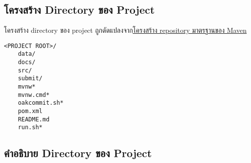 \pagebreak[4]

\rule{0em}{1ex}
\subsection*{โครงสร้าง Directory ของ Project}

โครงสร้าง directory ของ project ถูกดัดแปลงจาก\href{https://maven.apache.org/guides/introduction/introduction-to-the-standard-directory-layout.html}{โครงสร้าง repository มาตรฐานของ Maven}

\setlength{\parindent}{0em}
\setlength{\columnsep}{2pt}
\begin{lstlisting}[title={โครงสร้าง Directory ของ Project},numbers=none]
<PROJECT ROOT>/
    data/
    docs/
    src/
    submit/
    mvnw*
    mvnw.cmd*
    oakcommit.sh*
    pom.xml
    README.md
    run.sh*
\end{lstlisting}

\pagebreak[4]

\subsection*{คำอธิบาย Directory ของ Project}

